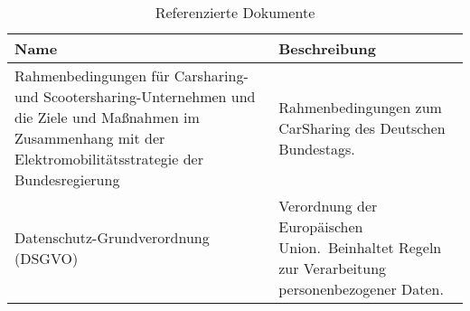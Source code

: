 \begin{table} [H]
    \centering
    \caption{Referenzierte Dokumente}
    \begin{tabularx}{\textwidth}{|X|X|}
        \toprule
        \textbf{Name} & \textbf{Beschreibung} \\
        \hline
        Rahmenbedingungen für Carsharing- und
        Scootersharing-Unternehmen und die Ziele und Maßnahmen im
        Zusammenhang mit der Elektromobilitätsstrategie der
        Bundesregierung & Rahmenbedingungen zum CarSharing des Deutschen Bundestags. \\
        \hline
        Datenschutz-Grundverordnung (DSGVO) & Verordnung der Europäischen Union.\ Beinhaltet Regeln zur Verarbeitung personenbezogener Daten. \\
        \bottomrule
    \end{tabularx}\label{tab:Referenzierte Dokumente}
\end{table}